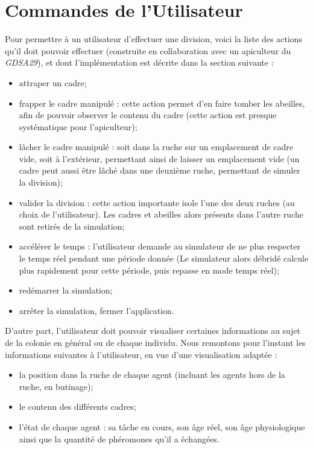 		

	\section{Commandes de l'Utilisateur}
	
	Pour permettre à un utilisateur d'effectuer une division, voici la liste des actions qu'il doit pouvoir effectuer (construite en collaboration avec un apiculteur du \textit{GDSA29}), et dont l'implémentation est décrite dans la section suivante :
		\begin{itemize}
			\item attraper un cadre;
			\item frapper le cadre manipulé : cette action permet d'en faire tomber les abeilles, afin de pouvoir observer le contenu du cadre (cette action est presque systématique pour l'apiculteur);
			\item lâcher le cadre manipulé : soit dans la ruche sur un emplacement de cadre vide, soit à l'extérieur, permettant ainsi de laisser un emplacement vide (un cadre peut aussi être lâché dans une deuxième ruche, permettant de simuler la division);
			\item valider la division : cette action importante isole l'une des deux ruches (au choix de l'utilisateur). Les cadres et abeilles alors présents dans l'autre ruche sont retirés de la simulation;
			\item accélérer le temps : l'utilisateur demande au simulateur de ne plus respecter le temps réel pendant une période donnée (Le simulateur alors débridé calcule plus rapidement pour cette période, puis repasse en mode temps réel);
			\item redémarrer la simulation;
			\item arrêter la simulation, fermer l'application.
		\end{itemize}	
		
		D'autre part, l'utilisateur doit pouvoir visualiser certaines informations au sujet de la colonie en général ou de chaque individu. Nous remontons pour l'instant les informations suivantes à l'utilisateur, en vue d'une visualisation adaptée :
		\begin{itemize}
			\item la position dans la ruche de chaque agent (incluant les agents hors de la ruche, en butinage);
			\item le contenu des différents cadres;
			\item l'état de chaque agent : sa tâche en cours, son âge réel, son âge physiologique ainsi que la quantité de phéromones qu'il a échangées.
		\end{itemize}		


